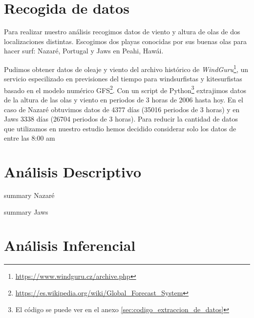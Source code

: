 \section{Recogida de datos}%
\label{sec:recogida_de_datos}
Para realizar nuestro análisis recogimos datos de viento y altura de olas de
dos localizaciones distintas. Escogimos dos playas conocidas por sus buenas
olas para hacer surf: Nazaré, Portugal y Jaws en Peahi, Hawái.

Pudimos obtener datos de oleaje y viento del archivo histórico de \emph{WindGuru}\footnote{\url{https://www.windguru.cz/archive.php}}, un servicio especilizado en previsiones del tiempo para windsurfistas y kitesurfistas basado en el modelo numérico GFS\footnote{\url{https://es.wikipedia.org/wiki/Global_Forecast_System}}. Con un script de
Python\footnote{El código se puede ver en el anexo
  \ref{sec:codigo_extraccion_de_datos}} extrajimos datos de la altura de las
olas y viento en periodos de 3 horas de 2006 hasta hoy. En el caso de Nazaré
obtuvimos datos de 4377 días (35016 periodos de 3 horas) y en Jaws 3338 días
(26704 periodos de 3 horas).
Para reducir la cantidad de datos que utilizamos en nuestro estudio hemos decidido considerar solo los datos de entre las 8:00 am


\section{Análisis Descriptivo}%
\label{sec:metodos}

\begin{table}[htbp]
\centering

\caption{summary Nazaré}
\end{table}

\begin{table}[htbp]
\centering

\caption{summary Jaws}
\end{table}

\section{Análisis Inferencial}%
\label{sec:resultados}



